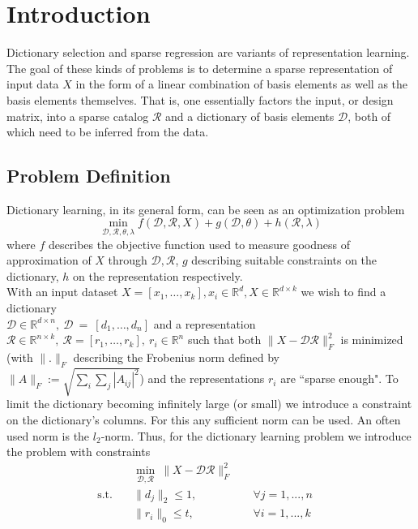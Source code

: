 \documentclass{article}
\newcommand{\R}{\mathbb{R}}
\newcommand{\Rr}{\mathcal{R}}
\newcommand{\D}{\mathcal{D}}
\begin{document}
\section{Introduction}\label{sec:intro}

Dictionary selection and sparse regression are variants of representation learning. The goal of these kinds of problems is to determine a sparse representation of input data $X$ in the form of a linear combination of basis elements as well as the basis elements themselves. That is, one essentially factors the input, or design matrix, into a sparse catalog $\mathcal{R}$ and a dictionary of basis elements $\mathcal{D}$, both of which need to be inferred from the data.\\

\subsection{Problem Definition}\label{sec:problem}
\noindent Dictionary learning, in its general form, can be seen as an optimization problem
\[
\min_{\D, \Rr, \theta, \lambda} f(\D, \Rr, X) + g(\D, \theta) + h(\Rr, \lambda)
\]
where $f$ describes the objective function used to measure goodness of approximation of $X$ through $\D, \Rr$, $g$ describing suitable constraints on the dictionary, $h$ on the representation respectively.\\

\noindent With an input dataset $X=[x_1, \dots, x_k],  x_i \in \R^d,  X \in \R^{d\times k}$ we wish to find a dictionary\\
$\D \in \R^{d\times n}, \   \D~=~[d_1, \dots, d_n]$ and a representation $\Rr \in\R^{n\times k}, \ \Rr = [r_1,\dots,r_k], \ r_i\in\R^n $  such that both $\|X-\D\Rr\|_F^2$ is minimized (with $\| . \|_F$ describing the Frobenius norm defined by $\|A\|_F := \sqrt{\sum_i\sum_j |A_{ij}|^2}$) and the representations $r_i$ are ``sparse enough". To limit the dictionary becoming infinitely large (or small) we introduce a constraint on the dictionary's columns. For this any sufficient norm can be used. An often used norm is the $l_2$-norm. 
Thus, for the dictionary learning problem we introduce the problem with constraints
\begin{align*}
         &\min_{\D, \Rr} \ \|X  -\D \Rr\|_F^2   \quad   \\
         \text{s.t.}  \quad  &\|d_j\|_2 \leq 1, \ &\forall j=1, ...,n  \quad \\
          \quad  &\|r_i\|_0 \leq t,  \ &\forall i=1, ...,k  \quad 
\end{align*}
\end{document}
